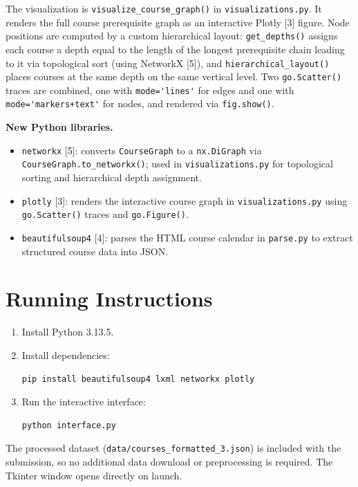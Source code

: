 \documentclass[11pt]{article}
\begin{document}
The visualization is \verb|visualize_course_graph()| in \verb|visualizations.py|. It renders
the full course prerequisite graph as an interactive Plotly [3] figure. Node positions are
computed by a custom hierarchical layout: \verb|get_depths()| assigns each course a depth
equal to the length of the longest prerequisite chain leading to it via topological sort
(using NetworkX [5]), and \verb|hierarchical_layout()| places courses at the same depth on
the same vertical level. Two \verb|go.Scatter()| traces are combined, one with
\verb|mode='lines'| for edges and one with \verb|mode='markers+text'| for nodes, and
rendered via \verb|fig.show()|.

\textbf{New Python libraries.}

\begin{itemize}
    \item \verb|networkx| [5]: converts \verb|CourseGraph| to a \verb|nx.DiGraph| via
    \verb|CourseGraph.to_networkx()|; used in \verb|visualizations.py| for topological
    sorting and hierarchical depth assignment.
    \item \verb|plotly| [3]: renders the interactive course graph in
    \verb|visualizations.py| using \verb|go.Scatter()| traces and \verb|go.Figure()|.
    \item \verb|beautifulsoup4| [4]: parses the HTML course calendar in \verb|parse.py|
    to extract structured course data into JSON.
\end{itemize}

\section*{Running Instructions}

\begin{enumerate}
    \item Install Python 3.13.5.
    \item Install dependencies:
\begin{verbatim}
pip install beautifulsoup4 lxml networkx plotly
\end{verbatim}
    \item Run the interactive interface:
\begin{verbatim}
python interface.py
\end{verbatim}
\end{enumerate}

The processed dataset (\verb|data/courses_formatted_3.json|) is included with the submission,
so no additional data download or preprocessing is required. The Tkinter window opens directly
on launch.
\end{document}
